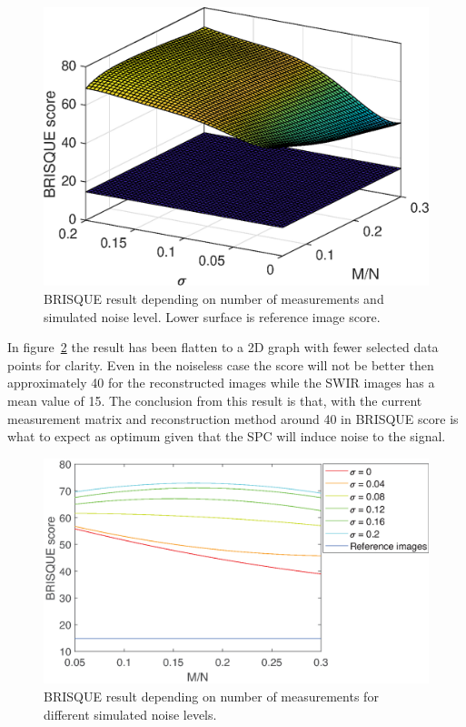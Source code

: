 \begin{figure}[H]
    \centering
    \includegraphics[width = 0.7\linewidth]{result/synt_brisque/BRISQUE_fit.eps}
    \caption{BRISQUE result depending on number of measurements and simulated noise level. Lower surface is reference image score.}
    \label{fig:Brisque_3d}
\end{figure}

In figure~\ref{fig:Brisque_2d} the result has been flatten to a 2D graph with fewer selected data points for clarity. Even in the noiseless case the score will not be better then approximately 40 for the reconstructed images while the SWIR images has a mean value of 15. The conclusion from this result is that, with the current measurement matrix and reconstruction method around 40 in BRISQUE score is what to expect as optimum given that the SPC will induce noise to the signal.   

\begin{figure}[H]
    \centering
    \includegraphics[width = 0.95\linewidth]{result/synt_brisque/Brisque_fit_flat3.eps}
    \caption{BRISQUE result depending on number of measurements for different simulated noise levels.}
    \label{fig:Brisque_2d}
\end{figure}
